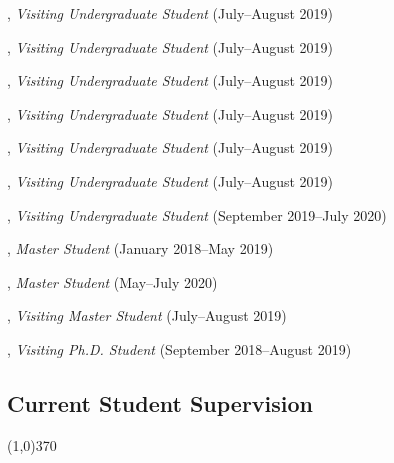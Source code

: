 \documentclass[10pt]{article}
\newenvironment{myindentpar}[1]%
{\begin{list}{}%
         {\setlength{\leftmargin}{#1}}%
         \item[]%
}
{\end{list}}
\newcounter{list}
\begin{document}
\begin{myindentpar}{0.75cm}
\hspace{-0.75cm}{\bf Xin Liu}, \textit{Visiting Undergraduate Student} (July--August 2019)

\hspace{-0.75cm}{\bf Wei Peng}, \textit{Visiting Undergraduate Student} (July--August 2019)

\hspace{-0.75cm}{\bf Mengxia Yu}, \textit{Visiting Undergraduate Student} (July--August 2019)

\hspace{-0.75cm}{\bf Kaifeng Yu}, \textit{Visiting Undergraduate Student} (July--August 2019)

\hspace{-0.75cm}{\bf Zhihan Zhang}, \textit{Visiting Undergraduate Student} (July--August 2019)

\hspace{-0.75cm}{\bf Yang Zhou}, \textit{Visiting Undergraduate Student} (July--August 2019)

\hspace{-0.75cm}{\bf Zaitang Li}, \textit{Visiting Undergraduate Student} (September 2019--July 2020)

\hspace{-0.75cm}{\bf Xueying Wang}, \textit{Master Student} (January 2018--May 2019)

\hspace{-0.75cm}{\bf Bhakti Sharma}, \textit{Master Student} (May--July 2020)

\hspace{-0.75cm}{\bf Zijian Hu}, \textit{Visiting Master Student} (July--August 2019)

\hspace{-0.75cm}{\bf Tianwen Jiang}, \textit{Visiting Ph.D. Student} (September 2018--August 2019)

\end{myindentpar}

\subsection{\sc Current Student Supervision}
\vspace{-0.4cm} \line(1,0){370} \vspace{-0.1cm}
\end{document}
